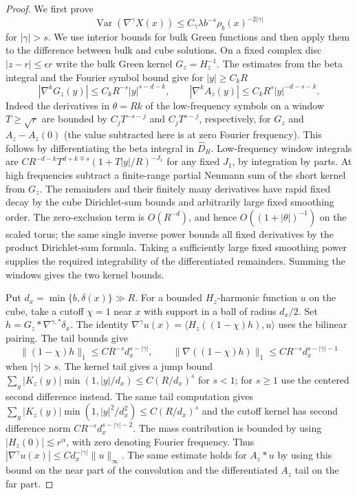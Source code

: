 \documentclass[11pt]{article}
\theoremstyle{definition}
\begin{document}
\begin{proof}
We first prove
\begin{equation}
 \operatorname{Var}(\nabla^\gamma X(x))
 \le C_\gamma\lambda b^{-s}\rho_b(x)^{-2|\gamma|}
\end{equation}
for \(|\gamma|>s\). We use interior bounds for bulk Green functions
and then apply them to the difference between bulk and cube solutions.
On a fixed complex disc \(|z-r|\le\epsilon r\)
write the bulk Green kernel \(G_z=H_z^{-1}\). The estimates
from the beta integral and the Fourier symbol bound give
for \(|y|\ge C_k R\)
\begin{equation}
 |\nabla^k G_z(y)|\le C_k R^{-s}|y|^{s-d-k},
 \qquad |\nabla^k A_z(y)|\le C_k R^s |y|^{-d-s-k}.
\end{equation}
Indeed the derivatives in \(\theta=Rk\) of the low-frequency
symbols on a window \(T\ge\sqrt r\) are bounded by
\(C_jT^{-s-j}\) and \(C_j T^{s-j}\), respectively, for
\(G_z\) and \(A_z-A_z(0)\) (the value subtracted here is
at zero Fourier frequency). This follows by differentiating
the beta integral in \(\widehat D_R\). Low-frequency window
integrals are \(C R^{-d-k} T^{d+k\mp s}
(1+T|y|/R)^{-J_1}\) for any fixed \(J_1\), by integration
by parts. At high frequencies subtract a finite-range
partial Neumann sum of the short kernel from \(G_z\).
The remainders and their finitely many derivatives have
rapid fixed decay by the cube Dirichlet-sum bounds and
arbitrarily large fixed smoothing order. The zero-exclusion term is \(O(R^{-d})\), and hence
\(O((1+|\theta|)^{-1})\) on the scaled torus; the same
single inverse power bounds all fixed derivatives by
the product Dirichlet-sum formula. Taking a sufficiently
large fixed smoothing power supplies the required
integrability of the differentiated remainders. Summing
the windows gives the two kernel bounds.

Put \(d_x=\min\{b,\delta(x)\}\gg R\). For a bounded
\(H_z\)-harmonic function \(u\) on the cube, take a cutoff
\(\chi=1\) near \(x\) with support in a ball of radius
\(d_x/2\). Set \(h=G_z*\nabla^{\gamma,*}\delta_x\).
The identity
\(\nabla^\gamma u(x)=\langle H_z((1-\chi)h),u\rangle\)
uses the bilinear pairing. The tail bounds give
\begin{equation}
 \|(1-\chi)h\|_1\le C R^{-s}d_x^{s-|\gamma|},\qquad
 \|\nabla((1-\chi)h)\|_1\le C R^{-s}d_x^{s-|\gamma|-1}
\end{equation}
when \(|\gamma|>s\). The kernel tail gives a jump bound
\(\sum_y |K_z(y)|\min(1,|y|/d_x)\le C(R/d_x)^s\)
for \(s<1\); for \(s\ge1\) use the centered second difference
instead. The same tail computation gives
\(\sum_y |K_z(y)|\min(1,|y|^2/d_x^2)\le C(R/d_x)^s\)
and the cutoff kernel has second difference norm
\(C R^{-s}d_x^{s-|\gamma|-2}\).
The mass contribution is bounded by using
\(|H_z(0)|\lesssim r^\alpha\), with zero denoting Fourier
frequency. Thus
\(|\nabla^\gamma u(x)|\le C d_x^{-|\gamma|}\|u\|_\infty\).
The same estimate holds for \(A_z*u\) by using this bound
on the near part of the convolution and the differentiated
\(A_z\) tail on the far part.


\end{proof}
\end{document}
